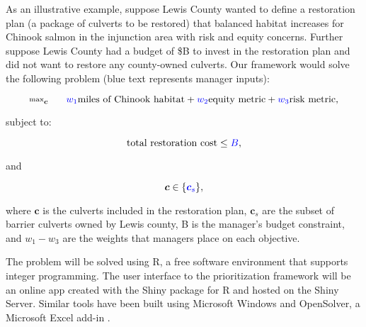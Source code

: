 \documentclass[12pt]{elsarticle}
\begin{document}

As an illustrative example, suppose Lewis County wanted to define a restoration plan (a package of culverts to be restored) that balanced habitat increases for Chinook salmon in the injunction area with risk and equity concerns. Further suppose Lewis County had a budget of \$B to invest in the restoration plan and did not want to restore any county-owned culverts. Our framework would solve the following problem (blue text represents manager inputs):

\begin{equation*}
\substack{\text{max}}_{\boldsymbol{c}}\hspace{0.25in} \textcolor{blue}{w_1} \text{miles of Chinook habitat} + \textcolor{blue}{w_2} \text{equity metric} + \textcolor{blue}{w_3} \text{risk metric},
\end{equation*}

\noindent subject to:

\begin{equation*}
\text{total restoration cost} \le \textcolor{blue}{B},
\end{equation*}

\noindent and

\begin{equation*}
\boldsymbol{c} \in \{\textcolor{blue}{\boldsymbol{c}_s}  \},
\end{equation*}

where $\boldsymbol{c}$ is the culverts included in the restoration plan, $\boldsymbol{c}_s$ are the subset of barrier culverts owned by Lewis county, B is the manager's budget constraint, and $w_1-w_3$ are the weights that managers place on each objective. 

The problem will be solved using R, a free software environment that supports integer programming. The user interface to the prioritization framework will be an online app created with the Shiny package for R and hosted on the Shiny Server. Similar tools have been built using Microsoft Windows \citep{optipass2015migratory} and OpenSolver, a Microsoft Excel add-in \citep{mcmanamay2019commonalities}.
\end{document}
